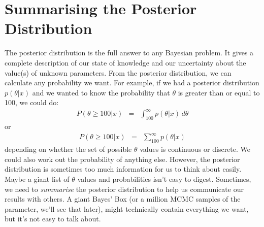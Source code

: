 \chapter{Summarising the Posterior Distribution}\label{chapter:summaries}
The posterior distribution is the full answer to any Bayesian problem. It gives
a complete description of our state of knowledge and our uncertainty about the
value(s) of unknown
parameters. From the posterior distribution, we can calculate any probability
we want. For example, if we had a posterior distribution $p(\theta|x)$ and we
wanted to know the probability that $\theta$ is greater than or equal to 100, we could do:
\begin{eqnarray}
P(\theta \geq 100 | x) &=& \int_{100}^\infty p(\theta | x) \, d\theta
\end{eqnarray}
or
\begin{eqnarray}
P(\theta \geq 100 | x) &=& \sum_{100}^\infty p(\theta | x)
\end{eqnarray}
depending on whether the set of possible $\theta$ values is continuous or
discrete. We could also work out the probability of anything else.
However, the posterior distribution is sometimes too much
information for us to think about easily. Maybe a giant list of $\theta$
values and probabilities isn't easy to digest. Sometimes,
we need to {\it summarise} the posterior distribution to help us
communicate our results with others. A giant Bayes' Box (or a million MCMC
samples of the parameter, we'll see that later), might technically
contain everything we want, but it's not easy to talk about.

